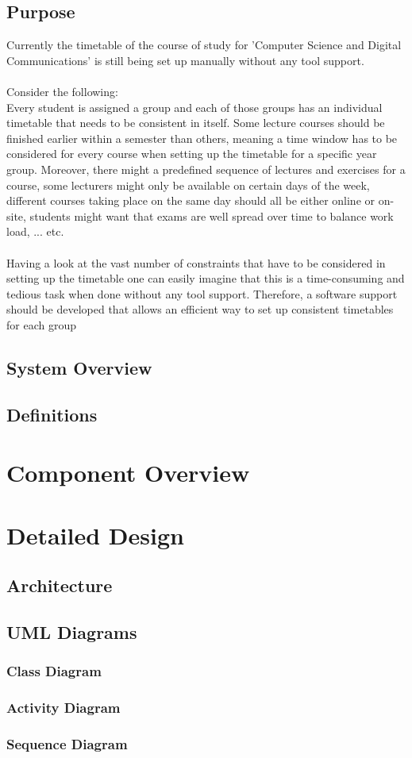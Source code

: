 \documentclass{scrreprt}
\begin{document}
	\section{Purpose}
	Currently the timetable of the course of study for 'Computer Science and Digital Communications' is still being set up manually without any tool support.\\\\
	Consider the following:\\
	Every student is assigned a group and each of those groups has an individual timetable that needs to be consistent in itself. Some lecture courses should be finished earlier	within a semester than others, meaning a time window has to be considered for every course when setting up the timetable for a specific year group. Moreover, there might a predefined sequence of lectures and exercises for a course, some lecturers might only be available on certain days of the week, different courses taking	place on the same day should all be either online or on-site, students might want that exams are well spread over time to balance work load, ... etc.\\\\
	Having a look at the vast number of constraints that have to be considered in setting up the timetable one can easily imagine that this is a time-consuming and tedious task when done without any tool support. Therefore, a software support should be developed that allows an efficient way to set up consistent timetables for each group


	
	\section{System Overview}
	
	\section{Definitions}
	
	\chapter{Component Overview}
	
	\chapter{Detailed Design}
	
	\section{Architecture}
	\section{UML Diagrams}
	\subsection{Class Diagram}
	\subsection{Activity Diagram}
	\subsection{Sequence Diagram}
	
	
\end{document}
